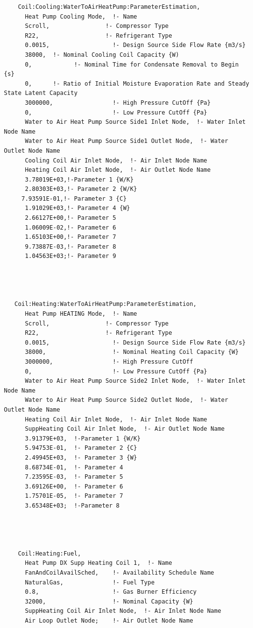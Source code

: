 \begin{lstlisting}
    Coil:Cooling:WaterToAirHeatPump:ParameterEstimation,
      Heat Pump Cooling Mode,  !- Name
      Scroll,                !- Compressor Type
      R22,                   !- Refrigerant Type
      0.0015,                  !- Design Source Side Flow Rate {m3/s}
      38000,  !- Nominal Cooling Coil Capacity {W)
      0,            !- Nominal Time for Condensate Removal to Begin {s}
      0,      !- Ratio of Initial Moisture Evaporation Rate and Steady State Latent Capacity
      3000000,                 !- High Pressure CutOff {Pa}
      0,                       !- Low Pressure CutOff {Pa}
      Water to Air Heat Pump Source Side1 Inlet Node,  !- Water Inlet Node Name
      Water to Air Heat Pump Source Side1 Outlet Node,  !- Water Outlet Node Name
      Cooling Coil Air Inlet Node,  !- Air Inlet Node Name
      Heating Coil Air Inlet Node,  !- Air Outlet Node Name
      3.78019E+03,!-Parameter 1 {W/K}
      2.80303E+03,!- Parameter 2 {W/K}
     7.93591E-01,!- Parameter 3 {C}
      1.91029E+03,!- Parameter 4 {W}
      2.66127E+00,!- Parameter 5
      1.06009E-02,!- Parameter 6
      1.65103E+00,!- Parameter 7
      9.73887E-03,!- Parameter 8
      1.04563E+03;!- Parameter 9




   Coil:Heating:WaterToAirHeatPump:ParameterEstimation,
      Heat Pump HEATING Mode,  !- Name
      Scroll,                !- Compressor Type
      R22,                   !- Refrigerant Type
      0.0015,                  !- Design Source Side Flow Rate {m3/s}
      38000,                   !- Nominal Heating Coil Capacity {W}
      3000000,                 !- High Pressure CutOff
      0,                       !- Low Pressure CutOff {Pa}
      Water to Air Heat Pump Source Side2 Inlet Node,  !- Water Inlet Node Name
      Water to Air Heat Pump Source Side2 Outlet Node,  !- Water Outlet Node Name
      Heating Coil Air Inlet Node,  !- Air Inlet Node Name
      SuppHeating Coil Air Inlet Node,  !- Air Outlet Node Name
      3.91379E+03,  !-Parameter 1 {W/K}
      5.94753E-01,  !- Parameter 2 {C}
      2.49945E+03,  !- Parameter 3 {W}
      8.68734E-01,  !- Parameter 4
      7.23595E-03,  !- Parameter 5
      3.69126E+00,  !- Parameter 6
      1.75701E-05,  !- Parameter 7
      3.65348E+03;  !-Parameter 8




    Coil:Heating:Fuel,
      Heat Pump DX Supp Heating Coil 1,  !- Name
      FanAndCoilAvailSched,    !- Availability Schedule Name
      NaturalGas,              !- Fuel Type
      0.8,                     !- Gas Burner Efficiency
      32000,                   !- Nominal Capacity {W}
      SuppHeating Coil Air Inlet Node,  !- Air Inlet Node Name
      Air Loop Outlet Node;    !- Air Outlet Node Name





\end{lstlisting}
